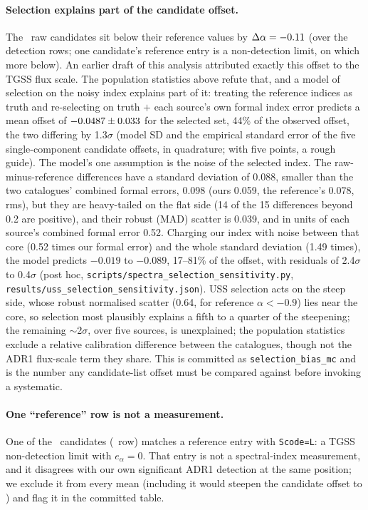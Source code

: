 \documentclass[twocolumn]{aastex631}
\newcommand{\code}[1]{\texttt{#1}}
\begin{document}
\paragraph{Selection explains part of the candidate offset.} The \usNuss\ raw candidates sit
below their reference values by $\Delta\alpha=-0.11$ (over the detection rows; one
candidate's reference entry is a non-detection limit, on which more below). An earlier draft of
this analysis attributed exactly this offset to the TGSS flux scale. The population statistics above
refute that, and a model of selection on the noisy index explains part of it: treating the reference indices as truth and re-selecting on truth $+$ each source's own
formal index error predicts a mean offset of $-0.0487\pm0.033$ for the selected
set, 44\% of the observed offset, the two differing by 1.3$\sigma$ (model SD and the empirical
standard error of the five single-component candidate offsets, in quadrature; with five points, a
rough guide). The model's one assumption is the noise of the selected index. The
raw-minus-reference differences have a standard deviation of 0.088, smaller than the two
catalogues' combined formal errors, 0.098 (ours 0.059, the reference's 0.078, rms), but they are
heavy-tailed on the flat side (14 of the 15 differences beyond 0.2 are positive), and their
robust (MAD) scatter is 0.039, and in units of each source's combined formal error 0.52.
Charging our index with noise
between that core (0.52 times our formal error) and the whole standard deviation (1.49 times),
the model predicts $-0.019$ to $-0.089$, 17--81\% of the offset, with residuals of 2.4$\sigma$ to
0.4$\sigma$ (post hoc, \code{scripts/spectra\_selection\_sensitivity.py},
\code{results/uss\_selection\_sensitivity.json}). USS selection acts on the steep side, whose robust
normalised scatter (0.64, for reference $\alpha<-0.9$) lies near the core, so selection most
plausibly explains a fifth to a quarter of the steepening; the remaining
$\sim$2$\sigma$, over five sources, is unexplained; the population statistics exclude a relative calibration difference
between the catalogues, though not the ADR1 flux-scale term they share. This is
committed as \code{selection\_bias\_mc} and is the number any candidate-list offset must be
compared against before invoking a systematic.

\paragraph{One ``reference'' row is not a measurement.} One of the \usNuss\ candidates
(\usRealNFlaggedLimit\ row) matches a reference entry with \code{Scode=L}: a TGSS non-detection
limit with $e_\alpha=0$. That entry is not a spectral-index measurement, and it disagrees with our
own significant ADR1 detection at the same position; we exclude it from every mean (including it
would steepen the candidate offset to \usRealFlaggedOffsetAll) and flag it in the committed table.
\end{document}
